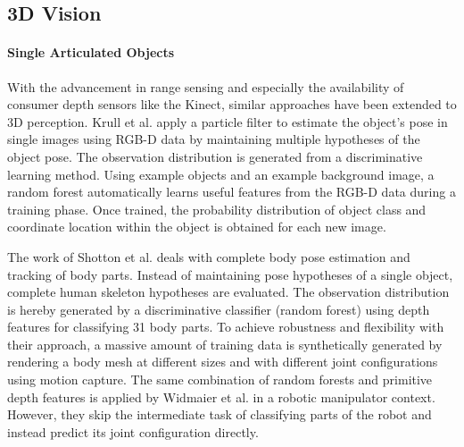 \subsection{3D Vision}
\label{sec:3d_vision}

\paragraph{Single Articulated Objects}
With the advancement in range sensing and especially the availability of consumer depth sensors like the Kinect, similar approaches have been extended to 3D perception. Krull et al. \cite{Krull2015} apply a particle filter to estimate the object's pose in single images using RGB-D data by maintaining multiple hypotheses of the object pose. The observation distribution is generated from a discriminative learning method. Using example objects and an example background image, a random forest automatically learns useful features from the RGB-D data during a training phase. Once trained, the probability distribution of object class and coordinate location within the object is obtained for each new image.

The work of Shotton et al. \cite{Shotton2013} deals with complete body pose estimation and tracking of body parts. Instead of maintaining pose hypotheses of a single object, complete human skeleton hypotheses are evaluated. The observation distribution is hereby generated by a discriminative classifier (random forest) using depth features for classifying 31 body parts. To achieve robustness and flexibility with their approach, a massive amount of training data is synthetically generated by rendering a body mesh at different sizes and with different joint configurations using motion capture.
The same combination of random forests and primitive depth features is applied by Widmaier et al. \cite{Widmaier2016} in a robotic manipulator context. However, they skip the intermediate task of classifying parts of the robot and instead predict its joint configuration directly.

